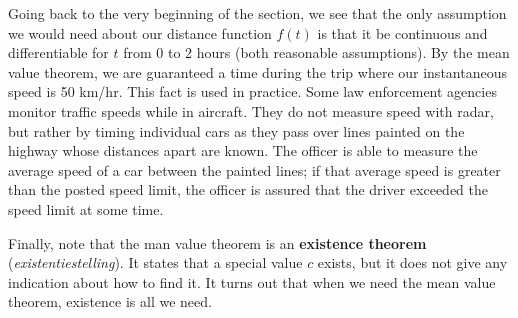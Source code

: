 Going back to the very beginning of the section, we see that the only assumption we would need about our distance function $f(t)$ is that it be continuous and differentiable for $t$ from 0 to 2 hours (both reasonable assumptions).  By the mean value theorem, we are guaranteed a time during the trip where our instantaneous speed is 50 km/hr. This fact is used in practice. Some law enforcement agencies monitor traffic speeds while in aircraft. They do not measure speed with radar, but rather by timing individual cars as they pass over lines painted on the highway whose distances apart are known. The officer is able to measure the average speed of a car between the painted lines; if that average speed is greater than the posted speed limit, the officer is assured that the driver exceeded the speed limit at some time.

Finally, note that the man value theorem is an \textbf{existence theorem} (\textit{existentiestelling}). It states that a special value $c$ exists, but it does not give any indication about how to find it. It turns out that when we need the mean value theorem, existence is all we need.

